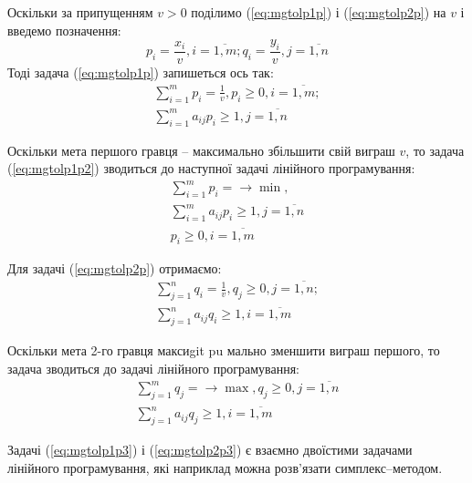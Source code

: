 \documentclass[12pt,a4paper]{book}
\begin{document}
Оскільки за припущенням $v>0$  поділимо (\ref{eq:mgtolp1p}) і (\ref{eq:mgtolp2p}) на $v$ і введемо позначення:
\[ \displaystyle p_i=\frac{x_i}{v},  i=\overline{1,m}; q_i=\frac{y_i}{v},  j=\overline{1,n} \]
Тоді задача (\ref{eq:mgtolp1p}) запишеться ось так:
\begin{equation}
\begin{array}{l}
\displaystyle \sum_{i=1}^m p_i = \frac{1}{v}, p_i \geq 0, i=\overline{1,m};\\
\displaystyle \sum_{i=1}^m a_{ij} p_i \geq 1,  j=\overline{1,n}
\end{array}
\label{eq:mgtolp1p2}
\end{equation}

Оскільки мета першого гравця – максимально збільшити свій виграш $v$, то задача (\ref{eq:mgtolp1p2}) зводиться до наступної задачі лінійного програмування:
\begin{equation}
\begin{array}{l}
\displaystyle \sum_{i=1}^m p_i = \to \min,\\
\displaystyle \sum_{i=1}^m a_{ij} p_i \geq 1,  j=\overline{1,n}\\
p_i \geq 0, i=\overline{1,m}
\end{array}
\label{eq:mgtolp1p3}
\end{equation}

Для задачі (\ref{eq:mgtolp2p}) отримаємо:
\begin{equation}
\begin{array}{l}
\displaystyle \sum_{j=1}^n q_i = \frac{1}{v}, q_j \geq 0, j=\overline{1,n};\\
\displaystyle \sum_{j=1}^n a_{ij} q_i \geq 1,  i=\overline{1,m}
\end{array}
\label{eq:mgtolp2p2}
\end{equation}

Оскільки мета 2-го гравця максиgit pu	мально зменшити виграш першого, то задача зводиться до задачі лінійного програмування:
\begin{equation}
\begin{array}{l}
\displaystyle \sum_{j=1}^m q_j = \to \max, q_j \geq 0, j=\overline{1,n}\\
\displaystyle \sum_{j=1}^n a_{ij} q_j \geq 1,  i=\overline{1,m}
\end{array}
\label{eq:mgtolp2p3}
\end{equation}

Задачі (\ref{eq:mgtolp1p3}) і (\ref{eq:mgtolp2p3}) є взаємно двоїстими задачами лінійного програмування, які наприклад можна розв’язати симплекс–методом.
\end{document}
